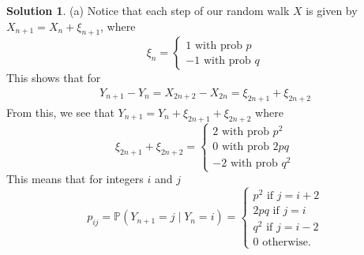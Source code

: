 \documentclass[12pt]{article}
\newcommand{\Prob}{\mathbb{P}}
\theoremstyle{definition}
\newtheorem{sol}{Solution}
\theoremstyle{remark}
\begin{document}
\begin{sol}

    (a) Notice that each step of our random walk $X$ is given by $X_{n+1} = X_{n} + \xi_{n+1}$, where
    \begin{equation*}
    \xi_{n}
    =    
    \begin{cases}
        1 \text{ with prob } p \\
        -1 \text{ with prob } q
    \end{cases}
    \end{equation*}
This shows that for 
\begin{align*}
    Y_{n+1} - Y_{n} = X_{2n+2} - X_{2n} = \xi_{2n+1} + \xi_{2n+2}
\end{align*}
From this, we see that $Y_{n+1} = Y_{n} + \xi_{2n+1} + \xi_{2n+2}$ where
\begin{equation*}
   \xi_{2n+1} + \xi_{2n+2}
   =    
   \begin{cases}
        2 \text{ with prob } p^{2} \\
        0 \text{ with prob } 2pq \\
        -2 \text{ with prob } q^{2}
    \end{cases}
\end{equation*}
This means that for integers $i$ and $j$
\begin{equation*}
    p_{ij} =  \Prob(Y_{n+1} = j \mid Y_{n} = i) = 
    \begin{cases}
    p^{2}    \text{ if } j = i + 2\\
    2pq \text{ if } j = i \\
    q^{2} \text{ if } j = i - 2 \\
    0 \text{ otherwise. }
\end{cases}
\end{equation*}

\newpage


\end{sol}
\end{document}
